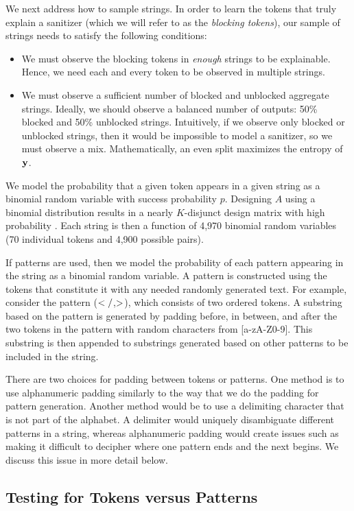We next address how to sample strings. In order to learn the tokens that truly explain a sanitizer (which we will refer to as the \emph{blocking tokens}), our sample of strings needs to satisfy the following conditions: 
\begin{itemize}
	\item We must observe the blocking tokens in \emph{enough} strings to be explainable. Hence, we need each and every token to be observed in multiple strings. 
	\item We must observe a sufficient number of blocked and unblocked aggregate strings. Ideally, we should observe a balanced number of outputs: 50\% blocked and 50\% unblocked strings. Intuitively, if we observe only blocked or unblocked strings, then it would be impossible to model a sanitizer, so we must observe a mix. Mathematically, an even split maximizes the entropy of $\mathbf{y}$.	
\end{itemize} 

We model the probability that a given token appears in a given string as a binomial random variable with success probability $p$. Designing $A$ using a binomial distribution results in a nearly $K$-disjunct design matrix with high probability \cite{Malyutov78}. Each string is then a function of 4,970 binomial random variables (70 individual tokens and 4,900 possible pairs). 

If patterns are used, then we model the probability of each pattern appearing in the string as a binomial random variable. A pattern is constructed using the tokens that constitute it with any needed randomly generated text.  For example, consider the pattern ($\sf{</}$,$\sf{>}$), which consists of two ordered tokens. A substring based on the pattern is generated by padding before, in between, and after the two tokens in the pattern with random characters from [a-zA-Z0-9]. This substring is then appended to substrings generated based on other patterns to be included in the string. 

There are two choices for padding between tokens or patterns. One method is to use alphanumeric padding similarly to the way that we do the padding for pattern generation. Another method would be to use a delimiting character that is not part of the alphabet. A delimiter would uniquely disambiguate different patterns in a string, whereas alphanumeric padding would create issues such as making it difficult to decipher where one pattern ends and the next begins. We discuss this issue in more detail below.

\subsection{Testing for Tokens versus Patterns}

